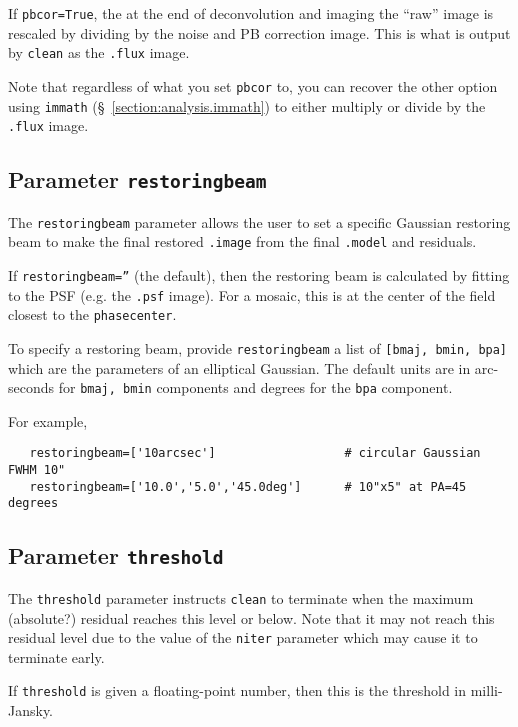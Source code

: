 If {\tt pbcor=True}, the at the end of deconvolution and imaging the
``raw'' image is rescaled by dividing by the noise and PB correction
image.  This is what is output by {\tt clean} as the {\tt .flux}
image.  

Note that regardless of what you set {\tt pbcor} to, you can recover
the other option using {\tt immath} (\S~\ref{section:analysis.immath})
to either multiply or divide by the {\tt .flux} image.

\subsection{Parameter {\tt restoringbeam} }
\label{section:im.clean.restoringbeam}

The {\tt restoringbeam} parameter allows the user to set a specific
Gaussian restoring beam to make the final restored {\tt .image} from
the final {\tt .model} and residuals.

If {\tt restoringbeam=''} (the default), then the restoring beam
is calculated by fitting to the PSF (e.g. the {\tt .psf} image).
For a mosaic, this is at the center of the field closest to the
{\tt phasecenter}.

To specify a restoring beam, provide {\tt restoringbeam} a list of 
{\tt [bmaj, bmin, bpa]} which are the parameters of an elliptical
Gaussian.  The default units are in arc-seconds for {\tt bmaj, bmin}
components and degrees for the {\tt bpa} component.

For example,
\small
\begin{verbatim}
   restoringbeam=['10arcsec']                  # circular Gaussian FWHM 10"
   restoringbeam=['10.0','5.0','45.0deg']      # 10"x5" at PA=45 degrees
\end{verbatim}
\normalsize

\subsection{Parameter {\tt threshold} }
\label{section:im.clean.thresh}

The {\tt threshold} parameter instructs {\tt clean} to terminate when
the maximum (absolute?) residual reaches this level or below.  Note
that it may not reach this residual level due to the value of the
{\tt niter} parameter which may cause it to terminate early.

If {\tt threshold} is given a floating-point number, then this is the
threshold in milli-Jansky.

